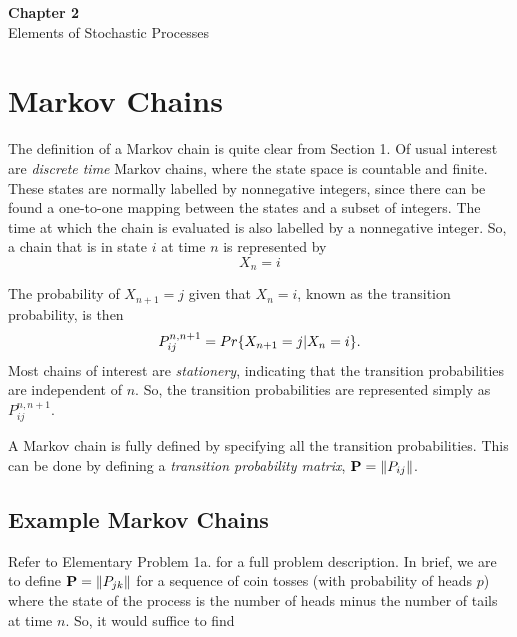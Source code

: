 
\begin{center}
{\LARGE \bf Chapter 2} \\
{\LARGE Elements of Stochastic Processes}\\
\end{center}

\section{Markov Chains}
\par The definition of a Markov chain is quite clear from Section 1. Of usual interest are {\it discrete
time} Markov chains, where the state space is countable and finite. These states are normally
labelled by nonnegative integers, since there can be found a one-to-one mapping between the states
and a subset of integers. The time at which the chain is evaluated is also labelled by a nonnegative
integer. So, a chain that is in state $i$ at time $n$ is represented by
\begin{equation}
X_n = i
\end{equation}

\par The probability of $X_{n+1} = j$ given that $X_n = i$, known as the transition probability, is then
\begin{equation}
P_{ij}^{n,n+1} = Pr\{X_{n+1}=j|X_n=i\}.
\end{equation}
Most chains of interest are {\it stationery}, indicating that the transition probabilities are
independent of $n$. So, the transition probabilities are represented simply as $P_{ij}^{n, n+1}$.

\par A Markov chain is fully defined by specifying all the transition probabilities. This can be done
by defining a {\it transition probability matrix}, $\mathbf{P} = \left\lVert P_{ij}\right\rVert$.

\subsection{Example Markov Chains}
\par Refer to Elementary Problem 1a. for a full problem description. In brief, we are to define
$\mathbf{P} = \left\lVert P_{jk}\right\rVert$ for a sequence of coin tosses (with probability of heads $p$)
where the state of the process is the number of heads minus the number of tails at time $n$. So,
it would suffice to find

